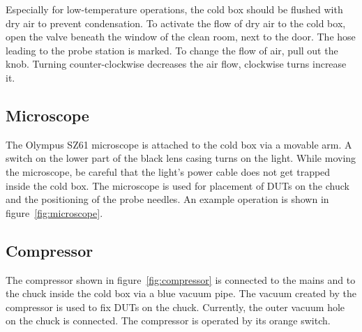 \documentclass[a4paper]{article}
\begin{document}
Especially for low-temperature operations, the cold box should be flushed with dry air to prevent condensation.
To activate the flow of dry air to the cold box, open the valve beneath the window of the clean room, next to the door.
The hose leading to the probe station is marked.
To change the flow of air, pull out the knob.
Turning counter-clockwise decreases the air flow, clockwise turns increase it.\\

\subsection{Microscope}
\label{sec:microscope}

The Olympus SZ61 microscope is attached to the cold box via a movable arm.
A switch on the lower part of the black lens casing turns on the light.
While moving the microscope, be careful that the light's power cable does not get trapped inside the cold box.
The microscope is used for placement of DUTs on the chuck and the positioning of the probe needles.
An example operation is shown in figure~\ref{fig:microscope}.\\

\subsection{Compressor}
\label{sec:compressor}

The compressor shown in figure~\ref{fig:compressor} is connected to the mains and to the chuck inside the cold box via a blue vacuum pipe.
The vacuum created by the compressor is used to fix DUTs on the chuck.
Currently, the outer vacuum hole on the chuck is connected.
The compressor is operated by its orange switch.\\
\end{document}
